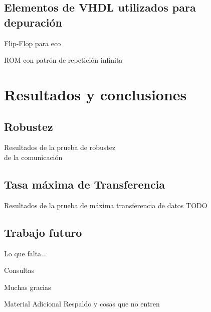 \documentclass[11pt,a4paper]{beamer}
\begin{document}
		\subsection{Elementos de VHDL utilizados para depuración}
			\begin{frame}{Flip-Flop para eco}
				
			\end{frame}
			\begin{frame}{ROM con patrón de repetición infinita}
				
			\end{frame}
	\section{Resultados y conclusiones}
		\subsection{Robustez}
			\begin{frame}{Resultados de la prueba de robustez\\de la comunicación}
				
			\end{frame}
		\subsection{Tasa máxima de Transferencia}
			\begin{frame}{Resultados de la prueba de máxima transferencia de datos}
				TODO
			\end{frame}
		\subsection{Trabajo futuro}
			\begin{frame}{Lo que falta...}
				
			\end{frame}
			\begin{frame}{Consultas}
				
			\end{frame}
			\begin{frame}[c]
				\centering
				\alert {Muchas gracias}
			\end{frame}
			
			\begin{frame}{Material Adicional}
				\centering
				Respaldo y cosas que no entren
			\end{frame}
			\scriptsize{
			}
\end{document}
